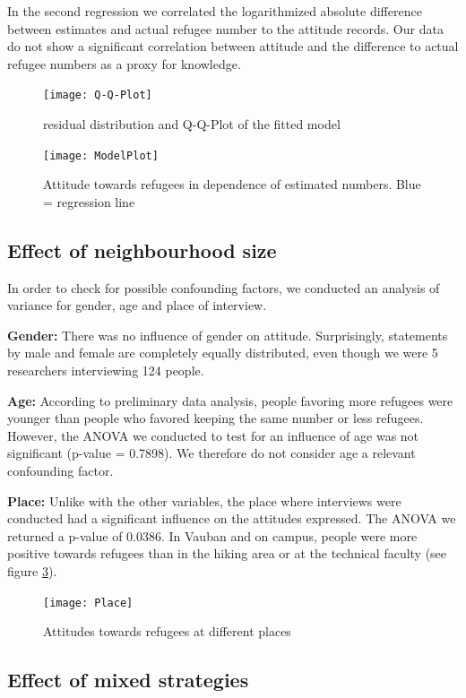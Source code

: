In the second regression we correlated the logarithmized absolute difference between estimates and actual refugee number to the attitude records. Our data do not show a significant correlation between attitude and the difference to actual refugee numbers as a proxy for knowledge.



\begin{figure}[H]
	\centering 
	\texttt{[image: Q-Q-Plot]}
	\caption{residual distribution and Q-Q-Plot of the fitted model}\label{fig: Q-Q-Plot}
\end{figure}


\begin{figure}[H]
	\centering 
	\texttt{[image: ModelPlot]}
	\caption{Attitude towards refugees in dependence of estimated numbers. Blue = regression line}\label{fig: ModelPlot}
\end{figure}


\subsection{Effect of neighbourhood size}

In order to check for possible confounding factors, we conducted an analysis of variance for gender, age and place of interview.

\textbf{Gender:} There was no influence of gender on attitude. Surprisingly, statements by male and female are completely equally distributed, even though we were 5 researchers interviewing 124 people. 

\textbf{Age:} According to preliminary data analysis, people favoring more refugees were younger than people who favored keeping the same number or less refugees. However, the ANOVA we conducted to test for an influence of age was not significant (p-value = 0.7898). We therefore do not consider age a relevant confounding factor.

\textbf{Place:} Unlike with the other variables, the place where interviews were conducted had a significant influence on the attitudes expressed. The ANOVA we returned a p-value of 0.0386.
In Vauban and on campus, people were more positive towards refugees than in the hiking area or at the technical faculty (see figure \ref{fig: Place}).

\begin{figure}
	\centering 
	\texttt{[image: Place]}
	\caption{Attitudes towards refugees at different places}\label{fig: Place}
\end{figure}


\subsection{Effect of mixed strategies}

